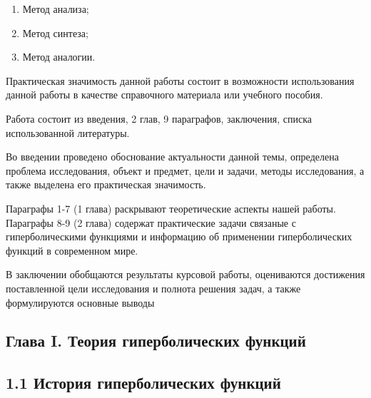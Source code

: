 \begin{enumerate}
    \item Метод анализа;
    \item Метод синтеза;
    \item Метод аналогии.
\end{enumerate}

Практическая значимость данной работы состоит в возможности использования данной работы в качестве справочного материала или учебного пособия.

Работа состоит из введения, 2 глав, 9 параграфов, заключения, списка использованной литературы.

Во введении проведено обоснование актуальности данной темы, определена проблема исследования, объект и предмет, цели и задачи, методы исследования, а также выделена его практическая значимость.

Параграфы 1-7 (1 глава) раскрывают теоретические аспекты нашей работы. Параграфы 8-9 (2 глава) содержат практические задачи связаные с гиперболическими функциями и информацию об применении гиперболических функций в современном мире.

В заключении обобщаются результаты курсовой работы, оцениваются достижения поставленной цели исследования и полнота решения задач, а также формулируются основные выводы


\newpage
\subsection*{Глава I. Теория гиперболических функций}

\subsection*{1.1 История гиперболических функций}


